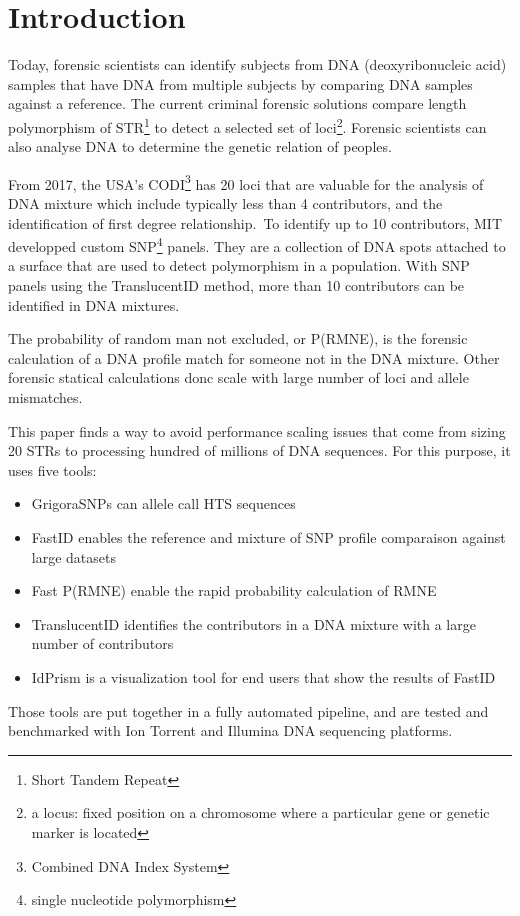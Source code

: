 \documentclass[../main.tex]{subfiles}
\begin{document}
\section{Introduction}

Today, forensic scientists can identify subjects from DNA (deoxyribonucleic acid) samples that have DNA from multiple subjects by comparing DNA samples against a reference.
The current criminal forensic solutions compare length polymorphism of STR\footnote{Short Tandem Repeat} to detect a selected set of loci\footnote{a locus: fixed position on a chromosome where a particular gene or genetic marker is located}. Forensic scientists can also analyse DNA to determine the genetic relation of peoples.

From 2017, the USA's CODI\footnote{Combined DNA Index System} has 20 loci\cite{fbi} that are valuable for the analysis of DNA mixture which include typically less than 4 contributors, and the identification of first degree relationship.\
To identify up to 10 contributors, MIT developped custom SNP\footnote{single nucleotide polymorphism} panels. They are a collection of DNA spots attached to a surface that are used to detect polymorphism in a population. With SNP panels using the TranslucentID\cite{translucentid} method, more than 10 contributors can be identified in DNA mixtures.

The probability of random man not excluded, or P(RMNE), is the forensic calculation of a DNA profile match for someone not in the DNA mixture. Other forensic statical calculations donc scale with large number of loci and allele mismatches.

This paper\cite{dna_forensic} finds a way to avoid performance scaling issues that come from sizing 20 STRs to processing hundred of millions of DNA sequences. For this purpose, it uses five tools:
\begin{itemize}
  \item{GrigoraSNPs can allele call HTS sequences} 
  \item{FastID\cite{fastid} enables the reference and mixture of SNP profile comparaison against large datasets}
  \item{Fast P(RMNE) enable the rapid probability calculation of RMNE}
  \item{TranslucentID identifies the contributors in a DNA mixture with a large number of contributors}
  \item{IdPrism is a visualization tool for end users that show the results of FastID}
\end{itemize}
Those tools are put together in a fully automated pipeline, and are tested and benchmarked with Ion Torrent and Illumina DNA sequencing platforms.
\end{document}
